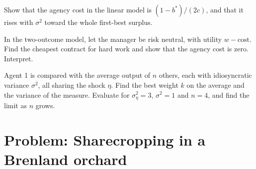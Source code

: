 \begin{exercise}[$\star\star\star$]\label{exo:b2:moral-hazard:10}
Show that the agency cost in the linear model is $(1 - b^*)/(2c)$, and that it rises with $\sigma^2$ toward the whole first-best surplus.
\end{exercise}

\begin{exercise}[$\star\star\star$]\label{exo:b2:moral-hazard:11}
In the two-outcome model, let the manager be risk neutral, with utility $w - \text{cost}$. Find the cheapest contract for hard work
and show that the agency cost is zero. Interpret.
\end{exercise}

\begin{exercise}[$\star\star\star$]\label{exo:b2:moral-hazard:12}
Agent 1 is compared with the average output of $n$ others, each with idiosyncratic variance $\sigma^2$, all sharing the shock $\eta$. Find
the best weight $k$ on the average and the variance of the measure. Evaluate for $\sigma_\eta^2 = 3$, $\sigma^2 = 1$ and $n = 4$, and find the limit as $n$ grows.
\end{exercise}

\section{Problem: Sharecropping in a Brenland orchard}\label{sec:b2:moral-hazard:problem}

